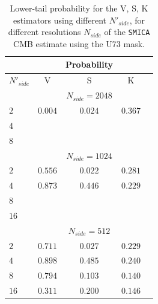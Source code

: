\begin{table}
\centering
\caption{Lower-tail probability for the V, S, K estimators using different $N'_{side}$, for different resolutions $N_{side}$ of the  \texttt{SMICA} CMB estimate using the U73 mask.}
\label{table:2}
\begin{tabular}{@{}lcccc}
\hline 
  & & Probability & \\
\hline  
$N'_{side}$ & V & S & K \\ 
\hline  
 & & $N_{side}=2048$ & \\
$2$ & $0.004 $ & $ 0.024$ & $0.367 $ \\ 
$4$ & $ $ & $ $ & $ $  \\
$8$ & $ $ & $  $ & $  $  \\
 & & $ N_{side} = 1024 $ & \\
$2$ & $ 0.556 $ & $ 0.022 $ & $ 0.281 $ \\ 
$4$ & $ 0.873 $ & $ 0.446 $ & $ 0.229 $  \\
$8$ & $  $ & $  $ & $  $  \\
$16$ & $  $ & $  $ & $  $  \\
 & & $N_{side} = 512$ & \\
$2$ & $0.711 $ & $ 0.027 $ & $ 0.229 $ \\ 
$4$ & $ 0.898 $ & $ 0.485 $ & $ 0.240 $  \\
$8$ & $ 0.794 $ & $ 0.103 $ & $ 0.140 $  \\
$16$ & $ 0.311 $ & $ 0.200 $ & $ 0.146 $  \\

\end{tabular}
\end{table}
